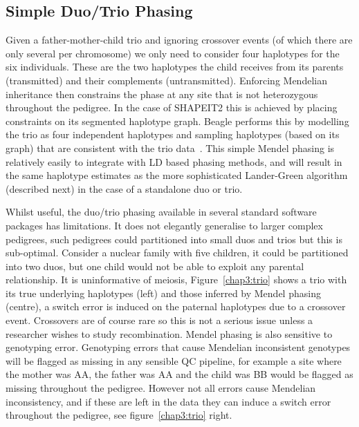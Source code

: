 \subsection{Simple Duo/Trio Phasing}
Given a father-mother-child trio and ignoring crossover events (of which there are only several per chromosome) we only need to consider four haplotypes for the six individuals.  These are the two haplotypes the child receives from its parents (transmitted) and their complements (untransmitted).  Enforcing Mendelian inheritance then constrains the phase at any site that is not heterozygous throughout the pedigree. In the case of SHAPEIT2 this is achieved by placing constraints on its segmented haplotype graph. Beagle performs this by modelling the trio as four independent haplotypes and sampling haplotypes (based on its graph) that are consistent with the trio data~\citep{browning2009unified}. This simple Mendel phasing is relatively easily to integrate with LD based phasing methods, and will result in the same haplotype estimates as the more sophisticated Lander-Green algorithm (described next) in the case of a standalone duo or trio.  

Whilst useful, the duo/trio phasing available in several standard software packages has limitations. It does not elegantly generalise to larger complex pedigrees, such pedigrees could partitioned into small duos and trios but this is sub-optimal.  Consider a nuclear family with five children, it could be partitioned into two duos, but one child would not be able to exploit any parental relationship.  It is uninformative of meiosis, Figure~\ref{chap3:trio} shows a trio with its true underlying haplotypes (left) and those inferred by Mendel phasing (centre), a switch error is induced on the paternal haplotypes due to a crossover event. Crossovers are of course rare so this is not a serious issue unless a researcher wishes to study recombination.  Mendel phasing is also sensitive to genotyping error.  Genotyping errors that cause Mendelian inconsistent genotypes will be flagged as missing in any sensible QC pipeline, for example a site where the mother was AA, the father was AA and the child was BB would be flagged as missing throughout the pedigree.  However not all errors cause Mendelian inconsistency, and if these are left in the data they can induce a switch error throughout the pedigree, see figure~\ref{chap3:trio} right.  

